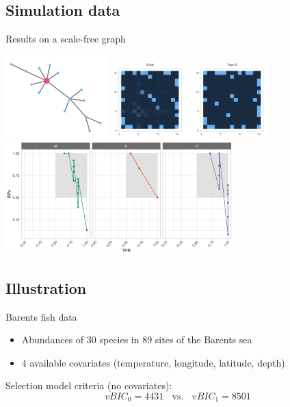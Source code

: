 \documentclass[11pt]{beamer}
\begin{document}
\subsection{Simulation data}
\begin{frame}{Results on a scale-free graph}
\begin{center}
\includegraphics[width=4cm]{images/SFgraph}
\pause
\includegraphics[width=6cm]{images/Ghat}\\
\pause
\includegraphics[width=8.8cm]{images/precrec_missing.png}
\end{center}
\end{frame}
\subsection{Illustration}
\begin{frame}{Barents fish data}
\begin{itemize}
\item Abundances of 30 species in 89 sites of the Barents sea
\item 4 available covariates (temperature, longitude, latitude, depth)
\end{itemize}

\bigskip\bigskip

Selection model criteria (no covariates):
$$vBIC_0 = 4431 \;\; \text{ vs. } \;\; vBIC_1 =8501$$

\end{frame}
\end{document}

